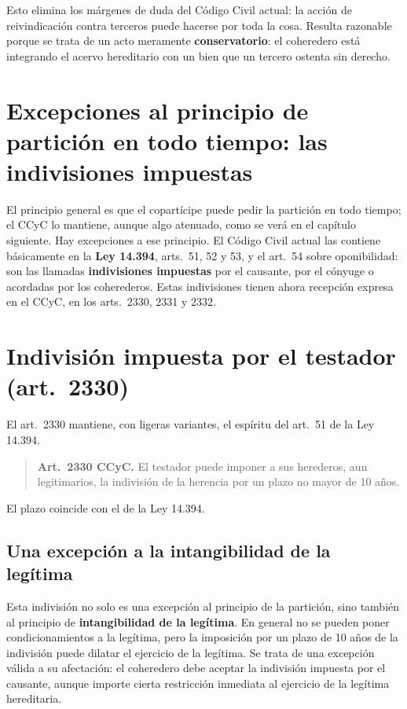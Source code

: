 \documentclass[12pt,oneside]{book}
\begin{document}
Esto elimina los márgenes de duda del Código Civil actual: la acción de reivindicación contra terceros puede hacerse por toda la cosa. Resulta razonable porque se trata de un acto meramente \textbf{conservatorio}: el coheredero está integrando el acervo hereditario con un bien que un tercero ostenta sin derecho.

\section[Indivisiones impuestas: excepciones a la partición]{Excepciones al principio de partición en todo tiempo: las indivisiones impuestas}

El principio general es que el copartícipe puede pedir la partición en todo tiempo; el CCyC lo mantiene, aunque algo atenuado, como se verá en el capítulo siguiente. Hay excepciones a ese principio. El Código Civil actual las contiene básicamente en la \textbf{Ley 14.394}, arts.~51, 52 y 53, y el art.~54 sobre oponibilidad: son las llamadas \textbf{indivisiones impuestas} por el causante, por el cónyuge o acordadas por los coherederos. Estas indivisiones tienen ahora recepción expresa en el CCyC, en los arts.~2330, 2331 y 2332.

\section{Indivisión impuesta por el testador (art.~2330)}

El art.~2330 mantiene, con ligeras variantes, el espíritu del art.~51 de la Ley 14.394.

\begin{quote}
\textbf{Art.~2330 CCyC.} El testador puede imponer a sus herederos, aun legitimarios, la indivisión de la herencia por un plazo no mayor de 10 años.
\end{quote}

El plazo coincide con el de la Ley 14.394.

\subsection{Una excepción a la intangibilidad de la legítima}

Esta indivisión no solo es una excepción al principio de la partición, sino también al principio de \textbf{intangibilidad de la legítima}. En general no se pueden poner condicionamientos a la legítima, pero la imposición por un plazo de 10 años de la indivisión puede dilatar el ejercicio de la legítima. Se trata de una excepción válida a su afectación: el coheredero debe aceptar la indivisión impuesta por el causante, aunque importe cierta restricción inmediata al ejercicio de la legítima hereditaria.
\end{document}
